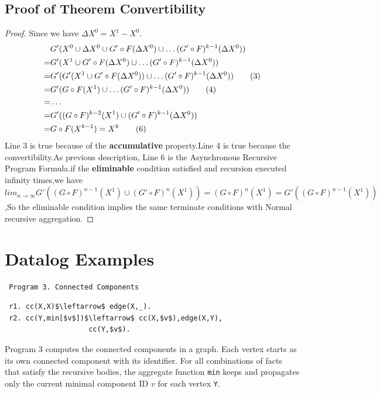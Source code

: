 \begin{appendix}
 \subsection{Proof of Theorem Convertibility}
 \begin{proof}
 Since we have $\Delta X^0=X^1-X^0$.
 \begin{align}
&G'(X^0\cup \Delta X^0 \cup G'\circ F(\Delta X^0)\cup \ldots (G' \circ F)^{k-1}(\Delta X^0 )) \notag\\
=&G'(X^1 \cup G'\circ F(\Delta X^0  )\cup \ldots (G' \circ F)^{k-1}(\Delta X^0  )) \notag\\
=&G'(G'(X^1\cup G'\circ F(\Delta X^0  ))\cup \ldots (G' \circ F)^{k-1}(\Delta X^0 )) \tag{3}\\
=&G'(G\circ F(X^1)\cup \ldots (G' \circ F)^{k-1}(\Delta X^0 )) \tag{4}\\
=&\ldots \notag\\
=&G'((G\circ F)^{k-2}(X^1)\cup(G' \circ F)^{k-1}(\Delta X^0 )) \notag\\
=&G\circ F(X^{k-1})=X^k\tag{6}
 \end{align}
Line 3 is true because of the \textbf{accumulative} property.Line 4 is true because the convertibility.As previous description, Line 6 is the Asynchronous Recursive Program Formula.if the \textbf{eliminable} condition satisfied and recursion executed infinity times,we have $lim_{n\rightarrow\infty}G'((G\circ F)^{n-1}(X^1)\cup (G' \circ F)^{n}(X^1))=(G\circ F)^{n}(X^1)=G'((G\circ F)^{n-1}(X^1))$,So the eliminable condition implies the same terminate conditions with Normal recursive aggregation.

 \end{proof}

 \section{Datalog Examples}
 \label{sec:app:example}
 
 \begin{verbatim}
 Program 3. Connected Components
 \end{verbatim}\vspace{-0.1in}\small
 \begin{lstlisting}
 r1. cc(X,X)$\leftarrow$ edge(X,_).
 r2. cc(Y,min[$v$])$\leftarrow$ cc(X,$v$),edge(X,Y),
                    cc(Y,$v$).
 \end{lstlisting}
 \normalsize
 
 Program 3 computes the connected components in a graph. Each vertex starts as its own connected component with its identifier. For all combinations of facts that satisfy the recursive bodies, the aggregate function \texttt{min} keeps and propagates only the current minimal component ID $v$ for each vertex \texttt{Y}.
 

\end{appendix}
